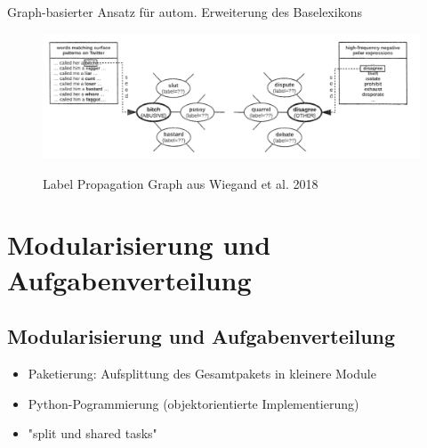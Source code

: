 \documentclass{beamer}
\begin{document}
\begin{frame}[plain, t]
{Graph-basierter Ansatz für autom. Erweiterung des Baselexikons}
\bigskip
\bigskip
\center
\begin{figure}[hbt]
    \begin{center}
        \includegraphics[width=\textwidth,height=0.95\textheight,keepaspectratio]{graph.png}\\
    \end{center}
\caption{Label Propagation Graph aus Wiegand et al. 2018}\label{preprocess}
\end{figure}

\end{frame}


\section{Modularisierung und Aufgabenverteilung}
\subsection[Modularisierung]{ Modularisierung und Aufgabenverteilung }

\begin{frame} 
\begin{itemize}
\item Paketierung: Aufsplittung des Gesamtpakets in kleinere Module
\item Python-Pogrammierung (objektorientierte Implementierung)
\item "split und shared tasks"
\end{itemize}
\end {frame}
\end{document}
